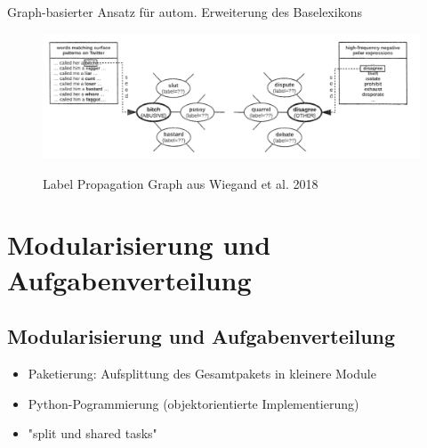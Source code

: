 \documentclass{beamer}
\begin{document}
\begin{frame}[plain, t]
{Graph-basierter Ansatz für autom. Erweiterung des Baselexikons}
\bigskip
\bigskip
\center
\begin{figure}[hbt]
    \begin{center}
        \includegraphics[width=\textwidth,height=0.95\textheight,keepaspectratio]{graph.png}\\
    \end{center}
\caption{Label Propagation Graph aus Wiegand et al. 2018}\label{preprocess}
\end{figure}

\end{frame}


\section{Modularisierung und Aufgabenverteilung}
\subsection[Modularisierung]{ Modularisierung und Aufgabenverteilung }

\begin{frame} 
\begin{itemize}
\item Paketierung: Aufsplittung des Gesamtpakets in kleinere Module
\item Python-Pogrammierung (objektorientierte Implementierung)
\item "split und shared tasks"
\end{itemize}
\end {frame}
\end{document}
